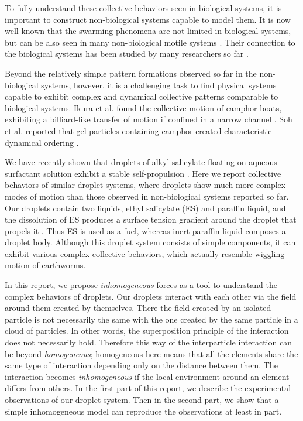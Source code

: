 \documentclass[showpacs]{revtex4-1}
\begin{document}
To fully understand these collective behaviors seen in biological
systems, it is important to construct non-biological systems capable to
model them. It is now well-known that the swarming phenomena are not
limited in biological systems, but can be also
seen in many non-biological motile systems
\cite{Sumino2012,Thutupalli2011,Bechinger2016}. Their connection to the
biological systems has been studied by many researchers so far
\cite{Marchetti2013}.

Beyond the relatively simple pattern formations observed so far in the
non-biological systems, however, it is a challenging task to find
physical systems capable to exhibit complex and dynamical collective
patterns comparable to biological systems. Ikura et al. found the
collective motion of camphor boats, exhibiting a billiard-like transfer
of motion if confined in a narrow channel
\cite{Ikura2013,Nakata2015}. Soh et al. reported that gel particles
containing camphor created characteristic dynamical ordering
\cite{Soh2011}.

We have recently shown that droplets of alkyl salicylate floating on
aqueous surfactant solution exhibit a stable self-propulsion
\cite{Tanaka2015}. Here we report collective behaviors of similar
droplet systems, where droplets show much more complex modes of motion
than those observed in non-biological systems reported so far. Our
droplets contain two liquids, ethyl salicylate (ES) and paraffin liquid,
and the dissolution of ES produces a surface tension gradient around the
droplet that propels it \cite{Tanaka2015}. Thus ES is used as a fuel,
whereas inert paraffin liquid composes a droplet body. Although this droplet
system consists of simple components, it can exhibit various complex
collective behaviors, which actually resemble wiggling motion of
earthworms.

In this report, we propose {\em inhomogeneous} forces as a tool to
understand the complex behaviors of droplets. Our droplets interact with
each other via the field around them created by themselves. There the
field created by an isolated particle is not necessarily the same with
the one created by the same particle in a cloud of particles. In other
words, the superposition principle of the interaction does not
necessarily hold. Therefore this way of the interparticle interaction
can be beyond {\em homogeneous}; homogeneous here means that all the
elements share the same type of interaction depending only on the
distance between them. The interaction becomes {\em inhomogeneous} if
the local environment around an element differs from others. In the
first part of this report, we describe the experimental observations of
our droplet system. Then in the second part, we show that a simple
inhomogeneous model can reproduce the observations at least in part.
\end{document}
